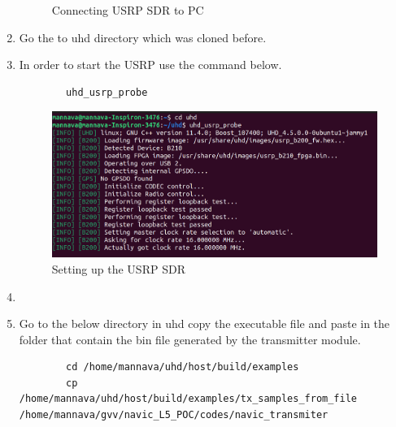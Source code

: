 \begin{enumerate}
\begin{normalsize}
\begin{figure}[ht]
        \centering
        \captionsetup{justification=centering}
        \caption{Connecting USRP SDR to PC}
        \end{figure}
    \end{normalsize}
    \item Go the to uhd directory which was cloned before.
    \item In order to start the USRP use the command below.
    \begin{lstlisting}
        uhd_usrp_probe
    \end{lstlisting}
    \begin{normalsize}
    \begin{figure}[ht]
        \centering
        \includegraphics[width=1\textwidth]{figs/usrp_probe.png}
        \centering
        \captionsetup{justification=centering}
        \caption{Setting up the USRP SDR}
        \end{figure}
    \end{normalsize}
    \item[]
    \item Go to the below directory in uhd copy the executable file and paste in the folder that contain the bin file generated by the transmitter module.
    \begin{lstlisting}
        cd /home/mannava/uhd/host/build/examples
        cp /home/mannava/uhd/host/build/examples/tx_samples_from_file          /home/mannava/gvv/navic_L5_POC/codes/navic_transmiter


\end{lstlisting}
\end{enumerate}
